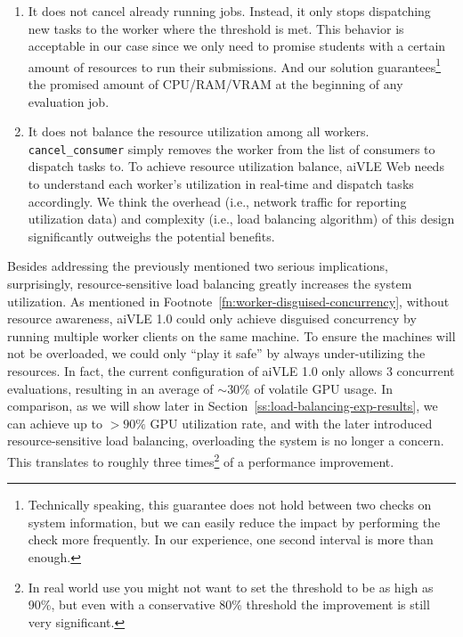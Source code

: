 \begin{enumerate}
    \item It does not cancel already running jobs. Instead, it only stops dispatching new tasks to the worker where the threshold is met. This behavior is acceptable in our case since we only need to promise students with a certain amount of resources to run their submissions. And our solution guarantees\footnote{Technically speaking, this guarantee does not hold between two checks on system information, but we can easily reduce the impact by performing the check more frequently. In our experience, one second interval is more than enough.} the promised amount of CPU/RAM/VRAM at the beginning of any evaluation job.
    \item It does not balance the resource utilization among all workers. \texttt{cancel\_consumer} simply removes the worker from the list of consumers to dispatch tasks to. To achieve resource utilization balance, aiVLE Web needs to understand each worker's utilization in real-time and dispatch tasks accordingly. We think the overhead (i.e., network traffic for reporting utilization data) and complexity (i.e., load balancing algorithm) of this design significantly outweighs the potential benefits.
\end{enumerate}

Besides addressing the previously mentioned two serious implications, surprisingly, resource-sensitive load balancing greatly increases the system utilization. As mentioned in Footnote~\ref{fn:worker-disguised-concurrency}, without resource awareness, aiVLE 1.0 could only achieve disguised concurrency by running multiple worker clients on the same machine. To ensure the machines will not be overloaded, we could only ``play it safe'' by always under-utilizing the resources. In fact, the current configuration of aiVLE 1.0 only allows 3 concurrent evaluations, resulting in an average of $\sim30\%$ of volatile GPU usage. In comparison, as we will show later in Section~\ref{ss:load-balancing-exp-results}, we can achieve up to $>90\%$ GPU utilization rate, and with the later introduced resource-sensitive load balancing, overloading the system is no longer a concern. This translates to roughly three times\footnote{In real world use you might not want to set the threshold to be as high as 90\%, but even with a conservative 80\% threshold the improvement is still very significant.} of a performance improvement.

